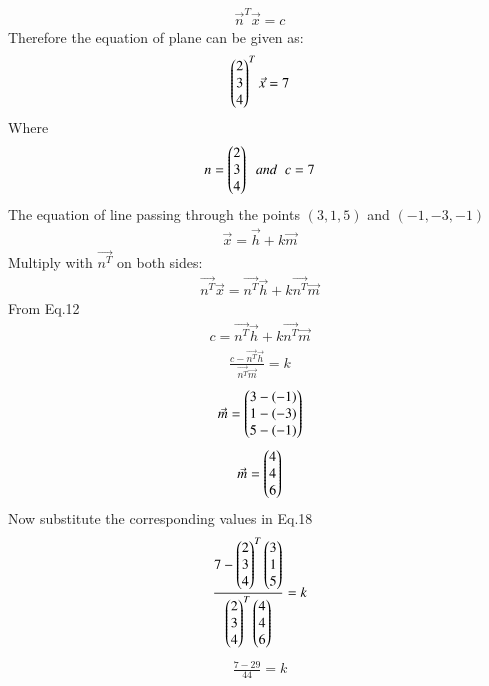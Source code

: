 \documentclass[journal]{IEEEtran}
\theoremstyle{remark}
\begin{document}
\begin{align}
\Vec{n}^T\Vec{x}=c
  \end{align}
Therefore the equation of plane can be given as:
\begin{align}
  \begin{pmatrix}2\\3\\4\end{pmatrix}^T\Vec{x}=7
\end{align}
Where
\begin{align}
    n=\begin{pmatrix}2\\3\\4\end{pmatrix}\;\;and\;\; c=7
\end{align}
The equation of line passing through the points $(3,1,5)$ and $(-1,-3,-1)$
\begin{align}
    \Vec{x}=\Vec{h}+k\Vec{m}
\end{align}
Multiply with $\Vec{n^T}$ on both sides:
\begin{align}
    \Vec{n^T}\Vec{x}=\Vec{n^T}\Vec{h}+k\Vec{n^T}\Vec{m}
\end{align}
From Eq.12
\begin{align}
    c=\Vec{n^T}\Vec{h}+k\Vec{n^T}\Vec{m}
\end{align}
\begin{align}
   \frac{ c-\Vec{n^T}\Vec{h}}{\Vec{n^T}\Vec{m}}=k
\end{align}
\begin{align}
    \Vec{m}=\begin{pmatrix}3-(-1)\\1-(-3)\\5-(-1)\end{pmatrix}
\end{align}
\begin{align}
     \Vec{m}=\begin{pmatrix}4\\4\\6\end{pmatrix}
\end{align}
Now substitute the corresponding values in Eq.18
\begin{align}
   \frac{7-\begin{pmatrix}2\\3\\4\end{pmatrix}^T\begin{pmatrix}3\\1\\5\end{pmatrix}}{\begin{pmatrix}2\\3\\4\end{pmatrix}^T\begin{pmatrix}4\\4\\6\end{pmatrix}}=k
\end{align}
\begin{align}
    \frac{7-29}{44}=k
\end{align}
\end{document}
